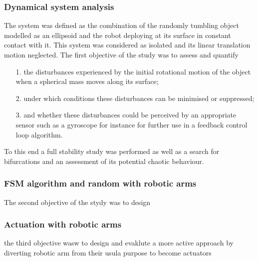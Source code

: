 \subsubsection{Dynamical system analysis}
\label{Dynamical system analysis}
The system was defined as the combination of the randomly tumbling object modelled as an ellipsoid and the robot deploying at its surface in constant contact with it. This system was considered as isolated and its linear translation motion neglected. The first objective of the study was to assess and quantify
\begin{enumerate}
	\item[1.]{the disturbances experienced by the initial rotational motion of the object when a spherical mass moves along its surface;}
	\item[2.]{under which conditions these disturbances can be minimised or suppressed;}
	\item[3.]{and whether these disturbances could be perceived by an appropriate sensor such as a gyroscope for instance for further use in a feedback control loop algorithm.}
\end{enumerate}
To this end a full stability study was performed as well as a search for bifurcations and an assessment of its potential chaotic behaviour.
\cite{ghc-pps}


\subsubsection{FSM algorithm and random with robotic arms}
\label{Actuation with robotic arms}
The second objective of the stydy was to design 
\cite{ghc-pps}

\subsubsection{Actuation with robotic arms}
\label{Actuation with robotic arms}
the third objective wasw to design and evaklute a more active approach by diverting robotic arm from their usula purpose to become actuators

\cite{ghc-pps}



%
%

